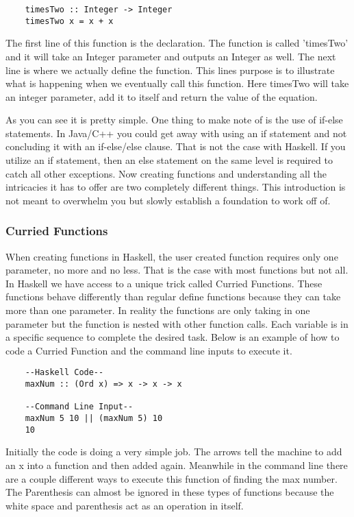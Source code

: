 \documentclass{article}
\begin{document}
    \begin{lstlisting}
    timesTwo :: Integer -> Integer
    timesTwo x = x + x 
    \end{lstlisting}
    
    \medskip
    The first line of this function is the declaration. The function is called 'timesTwo' and it will take an Integer parameter and outputs an Integer as well. The next line is where we actually define the function. This lines purpose is to illustrate what is happening when we eventually call this function. Here timesTwo will take an integer parameter, add it to itself and return the value of the equation. 
    
    \medskip
    As you can see it is pretty simple. One thing to make note of is the use of if-else statements. In Java/C++ you could get away with using an if statement and not concluding it with an if-else/else clause. That is not the case with Haskell. If you utilize an if statement, then an else statement on the same level is required to catch all other exceptions. Now creating functions and understanding all the intricacies it has to offer are two completely different things. This introduction is not meant to overwhelm you but slowly establish a foundation to work off of.
    
    \subsubsection{Curried Functions}
    When creating functions in Haskell, the user created function requires only one parameter, no more and no less. That is the case with most functions but not all. In Haskell we have access to a unique trick called Curried Functions. These functions behave differently than regular define functions because they can take more than one parameter. In reality the functions are only taking in one parameter but the function is nested with other function calls. Each variable is in a specific sequence to complete the desired task. Below is an example of how to code a Curried Function and the command line inputs to execute it. 
    
    \begin{lstlisting}
    --Haskell Code--
    maxNum :: (Ord x) => x -> x -> x 
    
    --Command Line Input--
    maxNum 5 10 || (maxNum 5) 10
    10
    \end{lstlisting}
    
    Initially the code is doing a very simple job. The arrows tell the machine to add an x into a function and then added again. Meanwhile in the command line there are a couple different ways to execute this function of finding the max number. The Parenthesis can almost be ignored in these types of functions because the white space and parenthesis act as an operation in itself.
    
\end{document}

